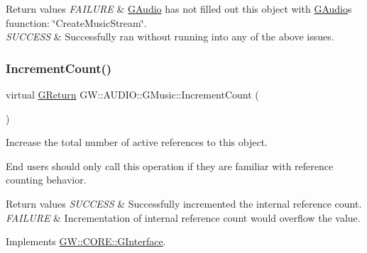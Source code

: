 \begin{DoxyRetVals}{Return values}
{\em F\+A\+I\+L\+U\+RE} & \mbox{\hyperlink{classGW_1_1AUDIO_1_1GAudio}{G\+Audio}} has not filled out this object with \mbox{\hyperlink{classGW_1_1AUDIO_1_1GAudio}{G\+Audio}}\textquotesingle{}s fuunction\+: \char`\"{}\+Create\+Music\+Stream\char`\"{}. \\
\hline
{\em S\+U\+C\+C\+E\+SS} & Successfully ran without running into any of the above issues. \\
\hline
\end{DoxyRetVals}
\mbox{\label{classGW_1_1AUDIO_1_1GMusic_a22d7a170b4d307e5398ebb92f950431f}} 
\subsubsection{\texorpdfstring{IncrementCount()}{IncrementCount()}}
{\footnotesize\ttfamily virtual \mbox{\hyperlink{namespaceGW_a67a839e3df7ea8a5c5686613a7a3de21}{G\+Return}} G\+W\+::\+A\+U\+D\+I\+O\+::\+G\+Music\+::\+Increment\+Count (\begin{DoxyParamCaption}{ }\end{DoxyParamCaption})\hspace{0.3cm}{\ttfamily [pure virtual]}}



Increase the total number of active references to this object. 

End users should only call this operation if they are familiar with reference counting behavior.


\begin{DoxyRetVals}{Return values}
{\em S\+U\+C\+C\+E\+SS} & Successfully incremented the internal reference count. \\
\hline
{\em F\+A\+I\+L\+U\+RE} & Incrementation of internal reference count would overflow the value. \\
\hline
\end{DoxyRetVals}


Implements \mbox{\hyperlink{classGW_1_1CORE_1_1GInterface_a2d710f20bb78e544e8309b5b75c21260}{G\+W\+::\+C\+O\+R\+E\+::\+G\+Interface}}.

\mbox{\label{classGW_1_1AUDIO_1_1GMusic_a0a0f4d5e0d11f7aec7ed9a1a6371df1a}} 
